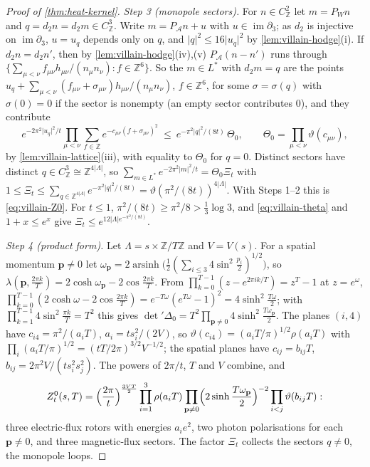 \documentclass[11pt,a4paper]{amsart}
\theoremstyle{definition}
\theoremstyle{remark}
\numberwithin{equation}{section}
\newcommand{\Z}{\mathbb{Z}}          %
\newcommand{\abs}[1]{\lvert #1\rvert}      %
\newcommand{\Vol}[1]{V(#1)}                %
\begin{document}
\begin{proof}[Proof of \cref{thm:heat-kernel}]
\emph{Step 3 (monopole sectors).} For $n\in C^2_\Z$ let $m=P_Wn$ and $q=d_2n=d_2m\in C^3_\Z$. Write $m=P_{\mathcal A}n+u$ with $u\in\operatorname{im}\partial_3$; as $d_2$ is injective on $\operatorname{im}\partial_3$, $u=u_q$ depends only on $q$, and $\abs q^2\le16\abs{u_q}^2$ by \cref{lem:villain-hodge}(i). If $d_2n=d_2n'$, then by \cref{lem:villain-hodge}(iv),(v) $P_{\mathcal A}(n-n')$ runs through $\{\sum_{\mu<\nu}f_{\mu\nu}h_{\mu\nu}/(n_\mu n_\nu):f\in\Z^6\}$. So the $m\in L^*$ with $d_2m=q$ are the points $u_q+\sum_{\mu<\nu}(f_{\mu\nu}+\sigma_{\mu\nu})h_{\mu\nu}/(n_\mu n_\nu)$, $f\in\Z^6$, for some $\sigma=\sigma(q)$ with $\sigma(0)=0$ if the sector is nonempty (an empty sector contributes $0$), and they contribute
\[
e^{-2\pi^2\abs{u_q}^2/t}\prod_{\mu<\nu}\sum_{f\in\Z}e^{-c_{\mu\nu}(f+\sigma_{\mu\nu})^2}\ \le\ e^{-\pi^2\abs q^2/(8t)}\,\Theta_0,\qquad\Theta_0=\prod_{\mu<\nu}\vartheta(c_{\mu\nu}),
\]
by \cref{lem:villain-lattice}(iii), with equality to $\Theta_0$ for $q=0$. Distinct sectors have distinct $q\in C^3_\Z\cong\Z^{4|\Lambda|}$, so $\sum_{m\in L^*}e^{-2\pi^2\abs m^2/t}=\Theta_0\Xi_t$ with $1\le\Xi_t\le\sum_{q\in\Z^{4|\Lambda|}}e^{-\pi^2\abs q^2/(8t)}=\vartheta(\pi^2/(8t))^{4|\Lambda|}$. With Steps 1--2 this is \eqref{eq:villain-Z0}. For $t\le1$, $\pi^2/(8t)\ge\pi^2/8>\frac13\log3$, and \eqref{eq:villain-theta} and $1+x\le e^x$ give $\Xi_t\le e^{12|\Lambda|e^{-\pi^2/(8t)}}$.

\emph{Step 4 (product form).} Let $\Lambda=s\times\Z/T\Z$ and $V=\Vol s$. For a spatial momentum $\mathbf p\ne0$ let $\omega_{\mathbf p}=2\operatorname{arsinh}\bigl(\frac12(\sum_{i\le3}4\sin^2\frac{p_i}2)^{1/2}\bigr)$, so $\lambda(\mathbf p,\frac{2\pi k}T)=2\cosh\omega_{\mathbf p}-2\cos\frac{2\pi k}T$. From $\prod_{k=0}^{T-1}(z-e^{2\pi ik/T})=z^T-1$ at $z=e^\omega$, $\prod_{k=0}^{T-1}(2\cosh\omega-2\cos\frac{2\pi k}T)=e^{-T\omega}(e^{T\omega}-1)^2=4\sinh^2\frac{T\omega}2$; with $\prod_{k=1}^{T-1}4\sin^2\frac{\pi k}T=T^2$ this gives $\det{}'\Delta_0=T^2\prod_{\mathbf p\ne0}4\sinh^2\frac{T\omega_{\mathbf p}}2$. The planes $(i,4)$ have $c_{i4}=\pi^2/(a_iT)$, $a_i=ts_i^2/(2V)$, so $\vartheta(c_{i4})=(a_iT/\pi)^{1/2}\rho(a_iT)$ with $\prod_i(a_iT/\pi)^{1/2}=(tT/2\pi)^{3/2}V^{-1/2}$; the spatial planes have $c_{ij}=b_{ij}T$, $b_{ij}=2\pi^2V/(ts_i^2s_j^2)$. The powers of $2\pi/t$, $T$ and $V$ combine, and
\begin{equation}\label{eq:villain-product}
Z^0_t(s,T)=\Bigl(\frac{2\pi}t\Bigr)^{\frac{3VT}2}\prod_{i=1}^3\rho(a_iT)\prod_{\mathbf p\ne0}\Bigl(2\sinh\frac{T\omega_{\mathbf p}}2\Bigr)^{-2}\prod_{i<j}\vartheta(b_{ij}T):
\end{equation}
three electric-flux rotors with energies $a_ie^2$, two photon polarisations for each $\mathbf p\ne0$, and three magnetic-flux sectors. The factor $\Xi_t$ collects the sectors $q\ne0$, the monopole loops.
\end{proof}
\end{document}
